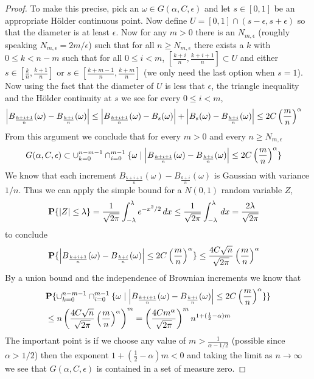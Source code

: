 \begin{proof}
To make this precise, pick an $\omega \in G(\alpha, C,\epsilon)$ and
let $s \in [0,1]$ be an appropriate H\"older continuous point.  Now
define $U = [0,1] \cap (s - \epsilon, s + \epsilon)$ so that the
diameter is at least $\epsilon$.  Now for any $m >0$ there is an
$N_{m,\epsilon}$ (roughly speaking $N_{m,\epsilon} = 2m/ \epsilon$)
such that for all $n \geq N_{m,\epsilon}$ there exists a $k$ with $0
\leq k < n-m$ such that for all $0\leq i < m$, $[\frac{k+i}{n},
\frac{k+i+1}{n}] \subset U$ and either $s \in [\frac{k}{n},
\frac{k+1}{n}]$ or $s \in [\frac{k+m-1}{n},\frac{k+m}{n}]$ (we only
need the last option when $s =1$).  Now using the fact that the
diameter of $U$ is less that $\epsilon$, the triangle inequality and
the H\"older continuity at $s$ we see for every $0 \leq i < m$,
\begin{align*}
\left \vert B_{\frac{k+i+1}{n}}(\omega) - B_{\frac{k+i}{n}}(\omega) \right \vert &\leq
\left \vert B_{\frac{k+i+1}{n}}(\omega) - B_{s}(\omega) \right \vert + \left \vert B_{s}(\omega)
  - B_{\frac{k+i}{n}}(\omega) \right \vert \leq 2 C \left( \frac{m}{n} \right)^\alpha
\end{align*}
From this argument we conclude that for every $m > 0$ and every $n
\geq N_{m, \epsilon}$
\begin{align*}
G(\alpha, C, \epsilon) &\subset \cup_{k=0}^{n-m-1} \cap_{i=0}^{m-1}
\lbrace \omega \mid \left \vert B_{\frac{k+i+1}{n}}(\omega) -
  B_{\frac{k+i}{n}}(\omega) \right \vert \leq 2 C \left( \frac{m}{n}
\right)^\alpha \rbrace
\end{align*}
We know that each increment $B_{\frac{k+i+1}{n}}(\omega) -
  B_{\frac{k+i}{n}}(\omega)$ is Gaussian with variance $1/n$.  Thus
 we can apply the simple bound for a $N(0,1)$ random
  variable $Z$,
\begin{align*}
\textbf{P}\{\left \vert Z \right \vert \leq \lambda\} &= \frac{1}{\sqrt{2\pi}}
\int_{-\lambda}^\lambda e^{-x^2/2} \, dx \leq \frac{1}{\sqrt{2\pi}}
\int_{-\lambda}^\lambda \, dx = \frac{2\lambda}{\sqrt{2\pi}}
\end{align*}
to conclude 
\begin{align*}
\textbf{P}\{\left \vert B_{\frac{k+i+1}{n}}(\omega) -
  B_{\frac{k+i}{n}}(\omega) \right \vert \leq 2 C \left( \frac{m}{n}
\right)^\alpha\} &\leq \frac{4 C \sqrt{n}}{\sqrt{2\pi}}\left( \frac{m}{n}
\right)^\alpha
\end{align*}
By a union bound and the independence of Brownian increments we know
that 
\begin{align*}
&\textbf{P}\{\cup_{k=0}^{n-m-1} \cap_{i=0}^{m-1}
\lbrace \omega \mid \left \vert B_{\frac{k+i+1}{n}}(\omega) -
  B_{\frac{k+i}{n}}(\omega) \right \vert \leq 2 C \left( \frac{m}{n}
\right)^\alpha \rbrace\} \\
&\leq n \left( \frac{4 C \sqrt{n}}{\sqrt{2\pi}}\left( \frac{m}{n}
\right)^\alpha\right)^m =\left( \frac{4 C m^\alpha}{\sqrt{2\pi}}\right)^m n^{1 + (\frac{1}{2}-\alpha)m}
\end{align*}
The important point is if we choose any value of $m > \frac{1}{\alpha
  - 1/2}$ (possible since $\alpha > 1/2$) then the exponent $1 +
(\frac{1}{2}-\alpha)m < 0$ and taking the limit as $n \to \infty$ we
see that $G(\alpha, C, \epsilon)$ is contained in a set of measure
zero.


\end{proof}
